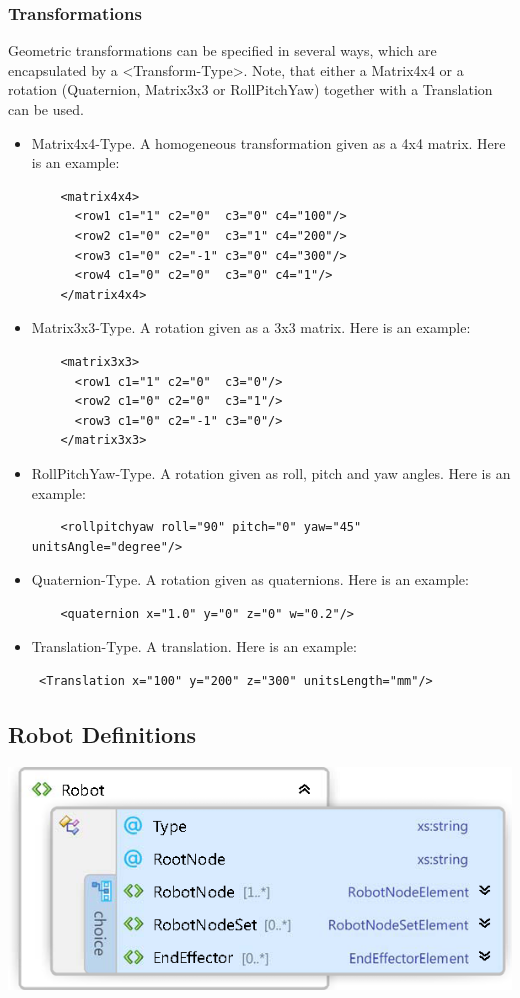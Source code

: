 \subsubsection{Transformations}
Geometric transformations can be specified in several ways, which are encapsulated by a <Transform-Type>. Note, that either a Matrix4x4 or a rotation (Quaternion, Matrix3x3 or RollPitchYaw) together with a Translation can be used. 
\begin{itemize}
\item Matrix4x4-Type. A homogeneous transformation given as a 4x4 matrix. Here is an example:
\begin{lstlisting}
    <matrix4x4>
      <row1 c1="1" c2="0"  c3="0" c4="100"/>
      <row2 c1="0" c2="0"  c3="1" c4="200"/>
      <row3 c1="0" c2="-1" c3="0" c4="300"/>
      <row4 c1="0" c2="0"  c3="0" c4="1"/>
    </matrix4x4>
\end{lstlisting}
\item Matrix3x3-Type. A rotation given as a 3x3 matrix. Here is an example: 
\begin{lstlisting}
    <matrix3x3>
      <row1 c1="1" c2="0"  c3="0"/>
      <row2 c1="0" c2="0"  c3="1"/>
      <row3 c1="0" c2="-1" c3="0"/>
    </matrix3x3>
\end{lstlisting}
\item RollPitchYaw-Type. A rotation given as roll, pitch and yaw angles. Here is an example: 
\begin{lstlisting}
    <rollpitchyaw roll="90" pitch="0" yaw="45" unitsAngle="degree"/>
\end{lstlisting}
\item Quaternion-Type. A rotation given as quaternions. Here is an example: 
\begin{lstlisting}
    <quaternion x="1.0" y="0" z="0" w="0.2"/>
\end{lstlisting}
\item Translation-Type. A translation. Here is an example: 
\begin{lstlisting}
 <Translation x="100" y="200" z="300" unitsLength="mm"/>
\end{lstlisting}
\end{itemize}
\subsection{Robot Definitions}
\includegraphics[width=\textwidth]{Xsd_Robot}
